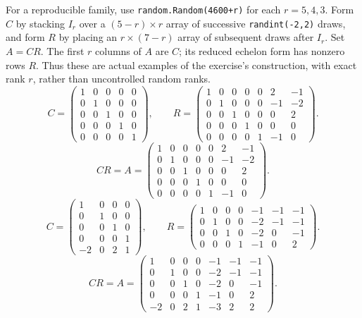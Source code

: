 For a reproducible family, use \texttt{random.Random(4600+r)} for each
$r=5,4,3$. Form $C$ by stacking $I_r$ over a $(5-r)\times r$ array of
successive \texttt{randint(-2,2)} draws, and form $R$ by placing an
$r\times(7-r)$ array of subsequent draws after $I_r$. Set $A=CR$.
The first $r$ columns of $A$ are $C$; its reduced echelon form has nonzero
rows $R$. Thus these are actual examples of the exercise's construction,
with exact rank $r$, rather than uncontrolled random ranks.
\[ C=\begin{pmatrix}1&0&0&0&0\\0&1&0&0&0\\0&0&1&0&0\\0&0&0&1&0\\0&0&0&0&1\end{pmatrix},\qquad R=\begin{pmatrix}1&0&0&0&0&2&-1\\0&1&0&0&0&-1&-2\\0&0&1&0&0&0&2\\0&0&0&1&0&0&0\\0&0&0&0&1&-1&0\end{pmatrix}.\]
\[ CR=A=\begin{pmatrix}1&0&0&0&0&2&-1\\0&1&0&0&0&-1&-2\\0&0&1&0&0&0&2\\0&0&0&1&0&0&0\\0&0&0&0&1&-1&0\end{pmatrix}.\]
\[ C=\begin{pmatrix}1&0&0&0\\0&1&0&0\\0&0&1&0\\0&0&0&1\\-2&0&2&1\end{pmatrix},\qquad R=\begin{pmatrix}1&0&0&0&-1&-1&-1\\0&1&0&0&-2&-1&-1\\0&0&1&0&-2&0&-1\\0&0&0&1&-1&0&2\end{pmatrix}.\]
\[ CR=A=\begin{pmatrix}1&0&0&0&-1&-1&-1\\0&1&0&0&-2&-1&-1\\0&0&1&0&-2&0&-1\\0&0&0&1&-1&0&2\\-2&0&2&1&-3&2&2\end{pmatrix}.\]
